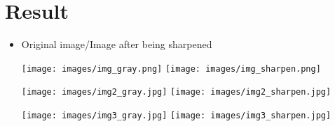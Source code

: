 \section{Result}
\begin{itemize}
    \item Original image/Image after being sharpened
    \begin{center}
        \texttt{[image: images/img\_gray.png]}
        \texttt{[image: images/img\_sharpen.png]}
    \end{center} 
    \begin{center}
        \texttt{[image: images/img2\_gray.jpg]}
        \texttt{[image: images/img2\_sharpen.jpg]}
    \end{center} 
    \begin{center}
        \texttt{[image: images/img3\_gray.jpg]}
        \texttt{[image: images/img3\_sharpen.jpg]}
    \end{center} 
\end{itemize}